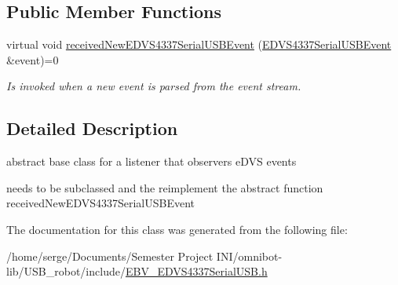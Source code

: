 \subsection*{Public Member Functions}
\begin{DoxyCompactItemize}
\item 
\hypertarget{class_e_d_v_s4337_serial_u_s_b_listener_abb1e87a2ef5c6eaea808b52a73c36e62}{}virtual void \hyperlink{class_e_d_v_s4337_serial_u_s_b_listener_abb1e87a2ef5c6eaea808b52a73c36e62}{received\+New\+E\+D\+V\+S4337\+Serial\+U\+S\+B\+Event} (\hyperlink{struct_e_d_v_s4337_serial_u_s_b_event}{E\+D\+V\+S4337\+Serial\+U\+S\+B\+Event} \&event)=0\label{class_e_d_v_s4337_serial_u_s_b_listener_abb1e87a2ef5c6eaea808b52a73c36e62}

\begin{DoxyCompactList}\small\item\em Is invoked when a new event is parsed from the event stream. \end{DoxyCompactList}\end{DoxyCompactItemize}


\subsection{Detailed Description}
abstract base class for a listener that observers e\+D\+V\+S events 

needs to be subclassed and the reimplement the abstract function received\+New\+E\+D\+V\+S4337\+Serial\+U\+S\+B\+Event 

The documentation for this class was generated from the following file\+:\begin{DoxyCompactItemize}
\item 
/home/serge/\+Documents/\+Semester Project I\+N\+I/omnibot-\/lib/\+U\+S\+B\+\_\+robot/include/\hyperlink{_e_b_v___e_d_v_s4337_serial_u_s_b_8h}{E\+B\+V\+\_\+\+E\+D\+V\+S4337\+Serial\+U\+S\+B.\+h}\end{DoxyCompactItemize}
